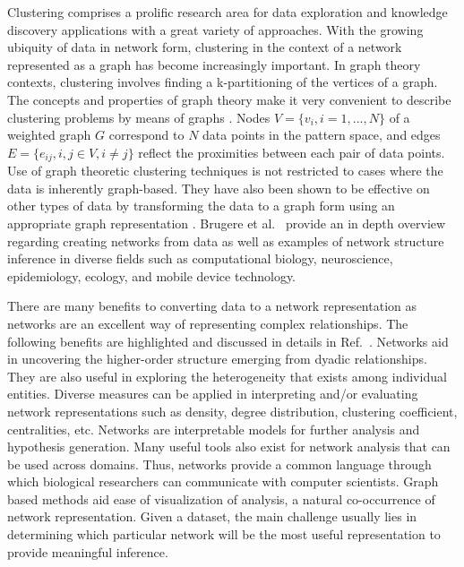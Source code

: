 \documentclass{bmcart}
\begin{document}
Clustering comprises a prolific research area for data exploration and knowledge discovery applications with a great variety of approaches. %
With the growing ubiquity of data in network form, clustering in the context of a network represented as a graph has become increasingly important.
In graph theory contexts, clustering involves finding a k-partitioning of the vertices of a graph. 
The concepts and properties of graph theory make it very convenient to describe clustering problems by means of graphs \cite{xu2009clustering}.  Nodes $V = \{v_i, i = 1 , ... , N\}$ of a weighted graph $G$ correspond to $N$ data points in the pattern space, and edges $E = \{e_{ij}, i,j \in V, i \neq j\}$ reflect the proximities between each pair of data points.
Use of graph theoretic clustering techniques is not restricted to cases where the data is inherently graph-based. They have also been shown to be effective on other types of data by transforming the data to a graph form using an appropriate graph representation \cite{alpert1999spectral}. Brugere et al.~\cite{Brugere2018} provide an in depth overview regarding creating networks from data as well as examples of network structure inference in diverse fields such as computational biology, neuroscience, epidemiology, ecology, and mobile device technology.

There are many benefits to converting data to a network representation as networks are an excellent way of representing complex relationships. The following benefits are highlighted and discussed in details in Ref.~\cite{Brugere2018}. Networks aid in uncovering the higher-order structure emerging from dyadic relationships. They are also useful in exploring the heterogeneity that exists among individual entities. 
Diverse measures can be applied in interpreting and/or evaluating network representations such as density, degree distribution, clustering coefficient, centralities, etc.  
Networks are interpretable models for further analysis and hypothesis generation. Many useful tools also exist for network analysis that can be used across domains. Thus, networks provide a common language through which biological researchers can communicate with computer scientists. Graph based methods aid ease of visualization of analysis, a natural co-occurrence of network representation. Given a dataset, the main challenge usually lies in determining which particular network will be the most useful representation to provide  meaningful inference.
\end{document}
